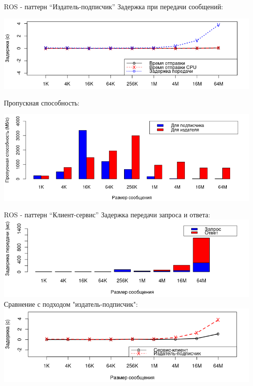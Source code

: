 \begin{frame}{ROS - паттерн \enquote{Издатель-подписчик}}
	Задержка при передачи сообщений:
	\begin{center}
		\includegraphics[width=.8\textwidth]{img/ros/ros_pubsub_l.png}
	\end{center}

	Пропускная способность:
	\begin{center}
		\includegraphics[width=.8\textwidth]{img/ros/ros_pubsub_bw.png}
	\end{center}
\end{frame}

\begin{frame}{ROS - паттерн \enquote{Клиент-сервис}}
Задержка передачи запроса и ответа:
\includegraphics[width=\textwidth]{img/ros/ros_rpc_l.png}
Сравнение с подходом "издатель-подписчик":
\includegraphics[width=\textwidth]{img/ros/ros_rpc_pubsub.png}
\end{frame}

